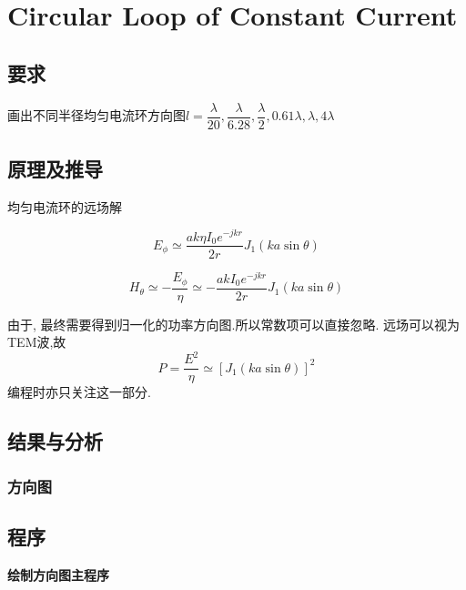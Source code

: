 

\section{Circular Loop  of Constant Current}
\subsection{要求}
\noindent 画出不同半径均匀电流环方向图$l=\dfrac{\lambda}{20},\dfrac{\lambda}{6.28},\dfrac{\lambda}{2},0.61\lambda,\lambda,4\lambda$ 

\subsection{原理及推导}
均匀电流环的远场解


\begin{equation}
E_\phi\simeq \dfrac{ak\eta I_0e^{-jkr}}{2r} J_1\left( ka\sin\theta\right)
\end{equation}


\begin{equation}
H_\theta\simeq -\dfrac{E_\phi}{\eta}
\simeq -\dfrac{ak I_0e^{-jkr}}{2r} J_1\left( ka\sin\theta\right)
\end{equation}

由于, 最终需要得到归一化的功率方向图.所以常数项可以直接忽略. 
远场可以视为TEM波,故
\begin{equation}
P=\dfrac{E^2}{\eta} \simeq \left[J_1\left( ka\sin\theta\right)\right]^2
\end{equation}
编程时亦只关注这一部分. 


\subsection{结果与分析}
\subsubsection{方向图}


\subsection{程序}
\noindent \textbf{绘制方向图主程序}
\begin{lstlisting}[language={matlab},keywordstyle=\color{blue!70},commentstyle=\color{red!50!green!50!blue!50},frame=shadowbox, rulesepcolor=\color{red!20!green!20!blue!20}] 

\end{lstlisting}

